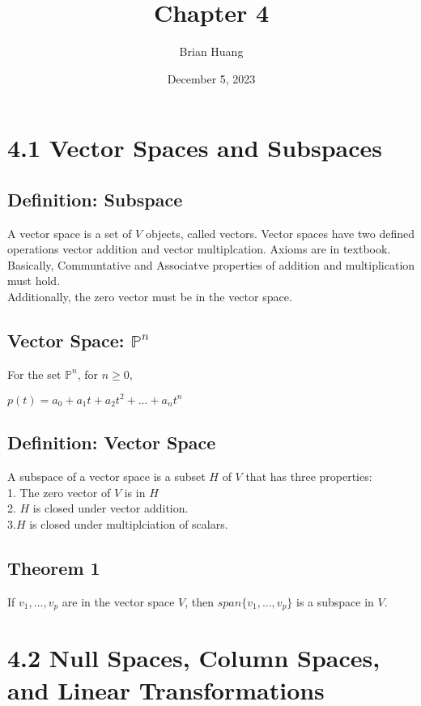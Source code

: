 \documentclass{article}
\title{Chapter 4}
\author{Brian Huang}
\date{December 5, 2023}
\begin{document}
    \maketitle
    \newpage
    \section*{4.1 Vector Spaces and Subspaces} 
    
    \subsection*{Definition: Subspace}
    A vector space is a set of $V$ objects, called vectors. Vector spaces have two defined operations vector addition and vector multiplcation. Axioms are in textbook.\\
    Basically, Communtative and Associatve properties of addition and multiplication must hold.\\
    Additionally, the zero vector must be in the vector space.

    \subsection*{Vector Space: $\mathbb{P}^n$}
    For the set $\mathbb{P}^n$, for $n\geq 0$, 
     \begin{center}
        $p(t) = a_0+a_1t+a_2t^2+...+a_nt^n$
    \end{center}

    \subsection*{Definition: Vector Space}
    A subspace of a vector space is a subset $H$ of $V$ that has three properties:\\
    1. The zero vector of $V$ is in $H$ \\
    2. $H$ is closed under vector addition.\\
    3.$H$ is closed under multiplciation of scalars.

    \subsection*{Theorem 1}
    If $v_1 ,..., v_p$ are in the vector space $V$, then $span\{v_1,...,v_p\}$ is a subspace in $V$.
    


    \section*{4.2 Null Spaces, Column Spaces, and Linear Transformations}
\end{document}
